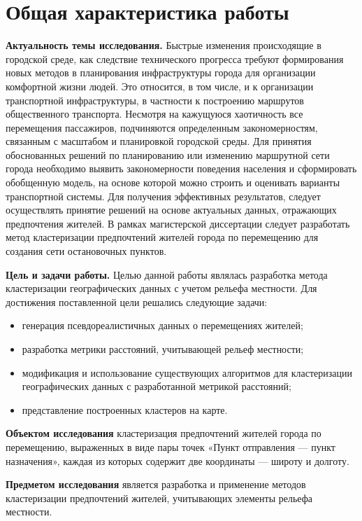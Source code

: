 \section{Общая характеристика работы}
\textbf{Актуальность темы исследования.} Быстрые изменения происходящие в городской среде, как следствие 
технического прогресса требуют формирования новых методов в планирования инфраструктуры города для 
организации комфортной жизни людей. Это относится, в том числе, и к организации транспортной 
инфраструктуры, в частности к построению маршрутов общественного транспорта. Несмотря на кажущуюся 
хаотичность все перемещения пассажиров, подчиняются определенным закономерностям, связанным с масштабом и 
планировкой городской среды. Для принятия обоснованных решений по планированию или изменению маршрутной 
сети города необходимо выявить закономерности поведения населения и сформировать обобщенную модель, на 
основе которой можно строить и оценивать варианты транспортной системы. Для получения эффективных 
результатов, следует осуществлять принятие решений на основе актуальных данных, отражающих предпочтения 
жителей. В рамках магистерской диссертации следует разработать метод кластеризации предпочтений жителей города по перемещению для создания сети остановочных пунктов.

\textbf{Цель и задачи работы.} Целью данной работы являлась разработка метода кластеризации географических данных с учетом рельефа местности. Для достижения 
поставленной цели решались следующие задачи:
\begin{itemize}
    \item генерация псевдореалистичных данных о перемещениях жителей;
    \item разработка метрики расстояний, учитывающей рельеф местности;
    \item модификация и использование существующих алгоритмов для кластеризации географических данных с разработанной метрикой расстояний;
    \item представление построенных кластеров на карте.
\end{itemize}

\textbf{Объектом исследования} кластеризация предпочтений жителей города по перемещению, выраженных в виде пары точек «Пункт отправления — пункт назначения», каждая из которых содержит две координаты — широту и долготу.

\textbf{Предметом исследования} является разработка и применение методов кластеризации предпочтений жителей, учитывающих элементы рельефа местности.

